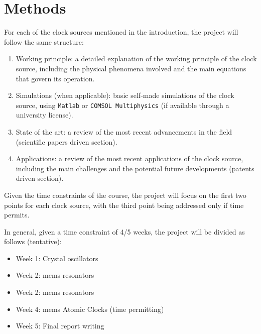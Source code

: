 \section{Methods}

For each of the clock sources mentioned in the introduction, the project will follow the same structure:

\begin{enumerate}
    \item Working principle: a detailed explanation of the working principle of the clock source, including the physical phenomena involved and the main equations that govern its operation.
    \item Simulations (when applicable): basic self-made simulations of the clock source, using \texttt{Matlab} or \texttt{COMSOL Multiphysics} (if available through a university license).
    \item State of the art: a review of the most recent advancements in the field (scientific papers driven section).
    \item Applications: a review of the most recent applications of the clock source, including the main challenges and the potential future developments (patents driven section).
\end{enumerate}

Given the time constraints of the course, the project will focus on the first two points for each clock source, with the third point being addressed only if time permits.

In general, given a time constraint of 4/5 weeks, the project will be divided as follows (tentative):

\begin{itemize}
    \item Week 1: Crystal oscillators
    \item Week 2: \acrshort{mems} resonators
    \item Week 2: \acrshort{mems} resonators
    \item Week 4: \acrshort{mems} Atomic Clocks (time permitting)
    \item Week 5: Final report writing
\end{itemize}
